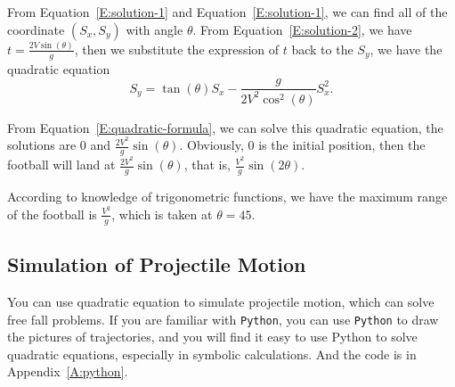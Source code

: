 From Equation~\eqref{E:solution-1} and Equation~\ref{E:solution-1}, we can find all of the coordinate $(S_x, S_y)$ with angle $\theta$. From Equation~\eqref{E:solution-2}, we have $t=\tfrac{2V\sin(\theta)}{g}$, then we substitute the expression of $t$ back to the $S_y$, we have the quadratic equation
\begin{equation}\label{E:solution-3}
    S_y = \tan(\theta)S_x - \frac{g}{2V^2\cos^2(\theta)}S_x^2.
\end{equation}

From Equation~\eqref{E:quadratic-formula}, we can solve this quadratic equation, the solutions are $0$ and $\tfrac{2V^2}{g}\sin(\theta)$. Obviously, $0$ is the initial position, then the football will land at $\tfrac{2V^2}{g}\sin(\theta)$, that is, $\tfrac{V^2}{g}\sin(2\theta)$.

According to knowledge of trigonometric functions, we have the maximum range of the football is $\tfrac{V^2}{g}$, which is taken at $\theta=45$.


\subsection{Simulation of Projectile Motion}
You can use quadratic equation to simulate projectile motion, which can solve free fall problems. If you are familiar with \texttt{Python}, you can use \texttt{Python} to draw the pictures of trajectories, and you will find it easy to use Python to solve quadratic equations, especially in symbolic calculations. And the code is in Appendix~\ref{A:python}.
